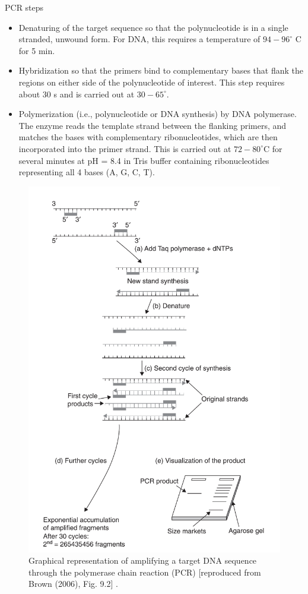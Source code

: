\documentclass[
  ignorenonframetext,
  aspectratio=169]{beamer}
\providecommand{\tightlist}{%
  \setlength{\itemsep}{0pt}\setlength{\parskip}{0pt}}
\begin{document}
\begin{frame}{PCR steps}
\protect\hypertarget{pcr-steps}{}
\begin{itemize}
\tightlist
\item
  Denaturing of the target sequence so that the polynucleotide is in a
  single stranded, unwound form. For DNA, this requires a temperature of
  \(94-96^\circ\) C for 5 min.
\item
  Hybridization so that the primers bind to complementary bases that
  flank the regions on either side of the polynucleotide of interest.
  This step requires about 30 s and is carried out at \(30-65^\circ\).
\item
  Polymerization (i.e., polynucleotide or DNA synthesis) by DNA
  polymerase. The enzyme reads the template strand between the flanking
  primers, and matches the bases with complementary ribonucleotides,
  which are then incorporated into the primer strand. This is carried
  out at \(72-80^\circ\)C for several minutes at pH = 8.4 in Tris buffer
  containing ribonucleotides representing all 4 bases (A, G, C, T).
\end{itemize}
\end{frame}

\begin{frame}{}
\protect\hypertarget{section-5}{}
\begin{figure}
\includegraphics[width=0.36\linewidth]{./../images/pcr_steps} \caption{Graphical representation of amplifying a target DNA sequence through the polymerase chain reaction (PCR) [reproduced from Brown (2006), Fig. 9.2] .}\label{fig:pcr-steps}
\end{figure}
\end{frame}
\end{document}
